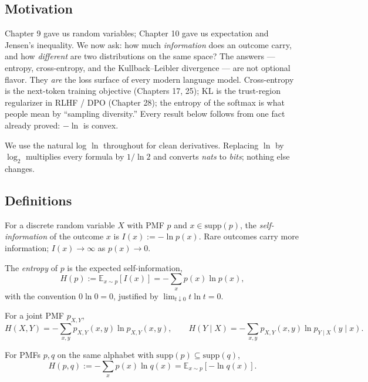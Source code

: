 \subsection*{Motivation}

Chapter 9 gave us random variables; Chapter 10 gave us expectation and Jensen's inequality. We now ask: how much \emph{information} does an outcome carry, and how \emph{different} are two distributions on the same space? The answers --- entropy, cross-entropy, and the Kullback--Leibler divergence --- are not optional flavor. They \emph{are} the loss surface of every modern language model. Cross-entropy is the next-token training objective (Chapters 17, 25); KL is the trust-region regularizer in RLHF / DPO (Chapter 28); the entropy of the softmax is what people mean by ``sampling diversity.'' Every result below follows from one fact already proved: $-\ln$ is convex.

We use the natural log $\ln$ throughout for clean derivatives. Replacing $\ln$ by $\log_2$ multiplies every formula by $1/\ln 2$ and converts \emph{nats} to \emph{bits}; nothing else changes.

\subsection*{Definitions}

\begin{definition}
For a discrete random variable $X$ with PMF $p$ and $x \in \mathrm{supp}(p)$, the \emph{self-information} of the outcome $x$ is $I(x) := -\ln p(x)$. Rare outcomes carry more information; $I(x) \to \infty$ as $p(x) \to 0$.
\end{definition}

\begin{definition}
The \emph{entropy} of $p$ is the expected self-information,
\[
H(p) := \mathbb{E}_{x \sim p}[I(x)] = -\sum_{x} p(x) \ln p(x),
\]
with the convention $0 \ln 0 = 0$, justified by $\lim_{t \downarrow 0} t \ln t = 0$.
\end{definition}

\begin{definition}
For a joint PMF $p_{X,Y}$,
\[
H(X, Y) = -\sum_{x,y} p_{X,Y}(x,y) \ln p_{X,Y}(x,y), \qquad H(Y \mid X) = -\sum_{x,y} p_{X,Y}(x,y) \ln p_{Y \mid X}(y \mid x).
\]
\end{definition}

\begin{definition}
For PMFs $p, q$ on the same alphabet with $\mathrm{supp}(p) \subseteq \mathrm{supp}(q)$,
\[
H(p, q) := -\sum_{x} p(x) \ln q(x) = \mathbb{E}_{x \sim p}[-\ln q(x)].
\]
\end{definition}

